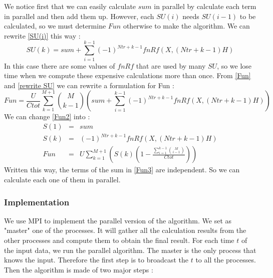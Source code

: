 \documentclass[11pt,a4paper]{article}
\begin{document}
We notice first that we can easily calculate $sum$ in parallel by calculate each term in parallel and then add them up. However, each $SU(i)$ needs $SU(i-1)$ to be calculated, so we must determine $Fun$ otherwise to make the algorithm.
We can rewrite \eqref{SU(i)} this way :
\begin{equation}
	SU(k) = sum + \sum_{i=1}^{k-1} (-1)^{Ntr+k-1}fnRf(X,(Ntr + k-1)H)
	\label{rewrite SU}
\end{equation}
In this case there are some values of $fnRf$ that are used by many $SU$, so we lose time when we compute these expensive calculations more than once.
From \eqref{Fun} and \eqref{rewrite SU} we can rewrite a formulation for Fun :
\begin{equation}
	Fun =\displaystyle{ \frac{U}{Ctot}  \sum_{k=1}^{M+1} \binom{M}{k-1}\left(sum + \sum_{i=1}^{k-1} (-1)^{Ntr+k-1}fnRf(X,(Ntr + k-1)H)\right)}
	\label{Fun2}
\end{equation}
We can change \eqref{Fun2} into :
\begin{eqnarray}
	S(1) &=& sum\\
	S(k) &=& (-1)^{Ntr+k-1}fnRf(X,(Ntr + k-1)H)\\
	Fun &=& \displaystyle{U \sum_{k=1}^{M+1}\left(S(k)(1-\frac{ \sum_{i=1}^{k-1} \binom{M}{i-1}}{Ctot})\right)} \label{Fun3}
\end{eqnarray}
Written this way, the terms of the sum in \eqref{Fun3} are independent. So we can calculate each one of them in parallel.

\subsubsection*{Implementation}

We use MPI to implement the parallel version of the algorithm. We set as "master" one of the processes. It will gather all the calculation results from the other processes and compute them to obtain the final result. For each time $t$ of the input data, we run the parallel algorithm. The master is the only process that knows the input. Therefore the first step is to broadcast the $t$ to all the processes. Then the algorithm is made of two major steps :
\end{document}
